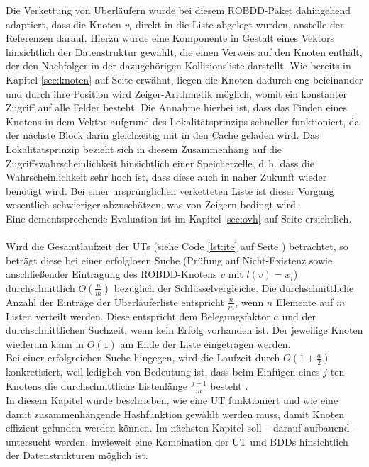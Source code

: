 Die Verkettung von Überläufern wurde bei diesem ROBDD-Paket dahingehend adaptiert, dass die Knoten $v_i$ direkt in die Liste abgelegt wurden, anstelle der Referenzen darauf. Hierzu wurde eine Komponente in Gestalt eines Vektors hinsichtlich der Datenstruktur gewählt, die einen Verweis auf den Knoten enthält, der den Nachfolger in der dazugehörigen Kollisionsliste darstellt. Wie bereits in Kapitel \ref{sec:knoten} auf Seite \pageref{sec:knoten} erwähnt, liegen die Knoten dadurch eng beieinander und durch ihre Position wird Zeiger-Arithmetik möglich, womit ein konstanter Zugriff auf alle Felder besteht. Die Annahme hierbei ist, dass das Finden eines Knotens in dem Vektor aufgrund des Lokalitätsprinzips schneller funktioniert, da der nächste Block darin gleichzeitig mit in den Cache geladen wird. Das Lokalitätsprinzip bezieht sich in diesem Zusammenhang auf die Zugriffswahrscheinlichkeit hinsichtlich einer Speicherzelle, d.\,h. dass die Wahrscheinlichkeit sehr hoch ist, dass diese auch in naher Zukunft wieder benötigt wird. Bei einer ursprünglichen verketteten Liste ist dieser Vorgang wesentlich schwieriger abzuschätzen, was von Zeigern bedingt wird.\\
Eine dementsprechende Evaluation ist im Kapitel \ref{sec:ovh} auf Seite \pageref{sec:ovh} ersichtlich.
\\\\
Wird die Gesamtlaufzeit der UTs (siehe Code \ref{lst:ite} auf Seite \pageref{lst:ite}) betrachtet, so beträgt diese bei einer erfolglosen Suche (Prüfung auf Nicht-Existenz sowie anschließender Eintragung des ROBDD-Knotens $v$ mit $l(v) = x_i$) durchschnittlich $O(\frac{n}{m})$ bezüglich der Schlüsselvergleiche. Die durchschnittliche Anzahl der Einträge der Überläuferliste entspricht $\frac{n}{m}$, wenn $n$ Elemente auf $m$ Listen verteilt werden. Diese entspricht dem Belegungsfaktor $a$ und der durchschnittlichen Suchzeit, wenn kein Erfolg vorhanden ist. Der jeweilige Knoten wiederum kann in $O(1)$ am Ende der Liste eingetragen werden.\\
Bei einer erfolgreichen Suche hingegen, wird die Laufzeit durch $O(1 + \frac{a}{2})$ konkretisiert, weil lediglich von Bedeutung ist, dass beim Einfügen eines $j$-ten Knotens die durchschnittliche Listenlänge $\frac{j-1}{m}$ besteht \cite[S.77]{h2002}.\\
In diesem Kapitel wurde beschrieben, wie eine UT funktioniert und wie eine damit zusammenhängende Hashfunktion gewählt werden muss, damit Knoten effizient gefunden werden können. Im nächsten Kapitel soll -- darauf aufbauend -- untersucht werden, inwieweit eine Kombination der UT und BDDs hinsichtlich der Datenstrukturen möglich ist.
